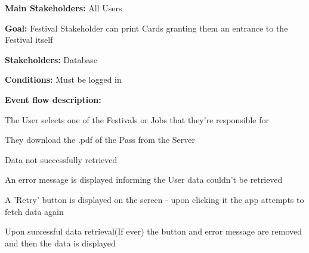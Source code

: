 			\noindent {}
			\begin{packed_item}
				\item \textbf{Main Stakeholders:} All Users
				\item \textbf{Goal:} Festival Stakeholder can print Cards granting them an entrance to the Festival itself
				\item \textbf{Stakeholders: } Database
				\item \textbf{Conditions: } Must be logged in
				\item \textbf{Event flow description: }
				\begin{packed_enum}
					\item The User selects one of the Festivals or Jobs that they're responsible for
					\item They download the .pdf of the Pass from the Server
				\end{packed_enum}
				
				\begin{packed_item}
					\item[2.a] Data not successfully retrieved
					\item[] \begin{packed_enum}
						\item An error message is displayed informing the User data couldn't be retrieved
						\item A 'Retry' button is displayed on the screen - upon clicking it the app attempts to fetch data again
						\item Upon successful data retrieval(If ever) the button and error message are removed and then the data is displayed
					\end{packed_enum}
				\end{packed_item}
			\end{packed_item}
		
